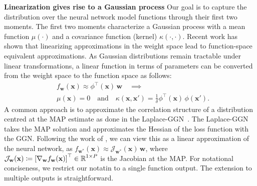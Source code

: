 \documentclass{article}
\newcommand{\weights}{\ensuremath{\mathbf{w}}}
\newcommand{\mbf}[1]{\mathbf{#1}}
\newcommand{\T}{\top}
\newcommand{\vx}{\mbf{x}}
\newcommand{\vw}{\mbf{w}}
\newcommand{\Jac}[2]{\mathcal{J}_{#1}(#2)}
\begin{document}
\textbf{Linearization gives rise to a Gaussian process}
Our goal is to capture the distribution over the neural network model functions through their first two moments. The first two moments characterize a Gaussian process with a mean function $\mu(\cdot)$ and a covariance function (kernel) $\kappa(\cdot,\cdot)$.
Recent work \citep{khan2019approximate,maddox2021fast} has shown that linearizing approximations in the weight space lead to function-space equivalent approximations.
As Gaussian distributions remain tractable under linear transformations, a linear function in terms of parameters can be converted from the weight space to the function space \citep[see Ch.~2.1 in ][]{rasmussen2006gaussian} as follows:
%
\begin{align} \label{eq:weight_func}
 &f_\weights(\vx) \approx
 \phi^\top\!(\vx) \, \vw \quad\implies \nonumber \\
 &\mu(\vx) = 0 \quad \text{and} \quad \kappa(\vx, \vx') = \frac{1}{\delta} \phi^\T\!(\vx) \, \phi(\vx').
\end{align}
A common approach is to approximate the correlation structure of a distribution centred at the MAP estimate as done in the Laplace-GGN~\citep{khan2019approximate, daxberger2021laplace, maddox2021fast}.
The Laplace-GGN takes the MAP solution and approximates the Hessian of the loss function
with the GGN.
Following the work of \citet{khan2019approximate}, we can view this as a linear approximation of the neural network, as $f_{\weights^*}(\vx) \approx
\Jac{\weights^*}{\vx} \, \weights$, where $\Jac{\weights}{\vx} \coloneqq \left[ \nabla_\weights f_\weights(\vx)\right]^\top \in \R^{1 \times P}$ is the Jacobian at the MAP.
For notational conciseness, we %
restrict our notatin to a single function output. The extension to multiple outputs is straightforward.
\end{document}
